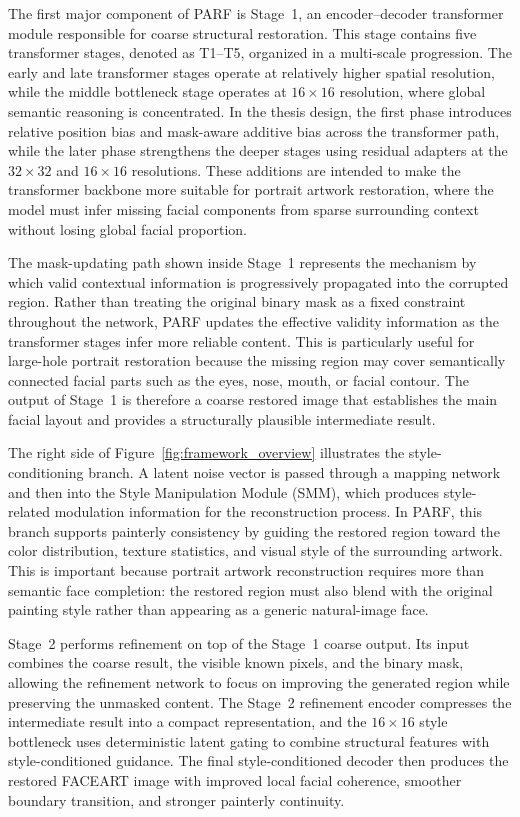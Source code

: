 \documentclass[12pt, twoside]{report}
\begin{document}
The first major component of PARF is Stage~1, an encoder--decoder transformer module responsible for coarse structural restoration.
This stage contains five transformer stages, denoted as T1--T5, organized in a multi-scale progression.
The early and late transformer stages operate at relatively higher spatial resolution, while the middle bottleneck stage operates at $16\times16$ resolution, where global semantic reasoning is concentrated.
In the thesis design, the first phase introduces relative position bias and mask-aware additive bias across the transformer path, while the later phase strengthens the deeper stages using residual adapters at the $32\times32$ and $16\times16$ resolutions.
These additions are intended to make the transformer backbone more suitable for portrait artwork restoration, where the model must infer missing facial components from sparse surrounding context without losing global facial proportion.

The mask-updating path shown inside Stage~1 represents the mechanism by which valid contextual information is progressively propagated into the corrupted region.
Rather than treating the original binary mask as a fixed constraint throughout the network, PARF updates the effective validity information as the transformer stages infer more reliable content.
This is particularly useful for large-hole portrait restoration because the missing region may cover semantically connected facial parts such as the eyes, nose, mouth, or facial contour.
The output of Stage~1 is therefore a coarse restored image that establishes the main facial layout and provides a structurally plausible intermediate result.

The right side of Figure~\ref{fig:framework_overview} illustrates the style-conditioning branch.
A latent noise vector is passed through a mapping network and then into the Style Manipulation Module (SMM), which produces style-related modulation information for the reconstruction process.
In PARF, this branch supports painterly consistency by guiding the restored region toward the color distribution, texture statistics, and visual style of the surrounding artwork.
This is important because portrait artwork reconstruction requires more than semantic face completion: the restored region must also blend with the original painting style rather than appearing as a generic natural-image face.

Stage~2 performs refinement on top of the Stage~1 coarse output.
Its input combines the coarse result, the visible known pixels, and the binary mask, allowing the refinement network to focus on improving the generated region while preserving the unmasked content.
The Stage~2 refinement encoder compresses the intermediate result into a compact representation, and the $16\times16$ style bottleneck uses deterministic latent gating to combine structural features with style-conditioned guidance.
The final style-conditioned decoder then produces the restored FACEART image with improved local facial coherence, smoother boundary transition, and stronger painterly continuity.
\end{document}
